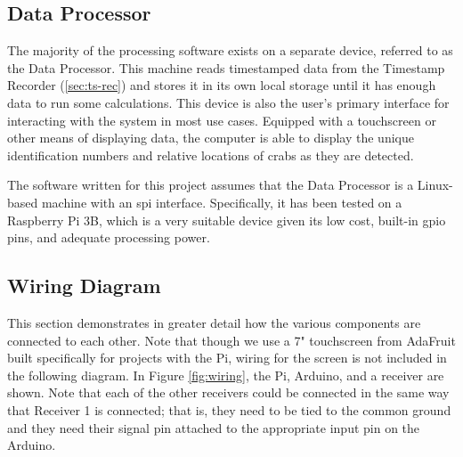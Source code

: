\documentclass[12pt]{article}
\begin{document}
\subsection{Data Processor}\label{sec:data-processor}

The majority of the processing software exists on a separate device, referred
to as the Data Processor.
This machine reads timestamped data from the
Timestamp Recorder (\ref{sec:ts-rec}) and stores it in its own local storage
until it has enough data to run some calculations.
This device is also the user's primary interface for interacting with the
system in most use cases.
Equipped with a touchscreen or other means of displaying data, the computer is
able to display the unique identification numbers and relative locations of
crabs as they are detected.

The software written for this project assumes that the Data Processor is a
Linux-based machine with an \gls{spi} interface.
Specifically, it has been tested on a Raspberry Pi 3B, which is a very
suitable device given its low cost, built-in \gls{gpio} pins, and adequate
processing power.

\subsection{Wiring Diagram}\label{sec:wiring}

This section demonstrates in greater detail how the various components are
connected to each other.
Note that though we use a 7" touchscreen from AdaFruit built specifically
for projects with the Pi,
wiring for the screen is not included in the following diagram.
In Figure \ref{fig:wiring}, the Pi, Arduino, and a receiver are shown.
Note that each of the other receivers could be connected in the same way
that Receiver 1 is connected; that is, they need to be tied to the common
ground and they need their signal pin attached to the appropriate input pin
on the Arduino.
\end{document}
